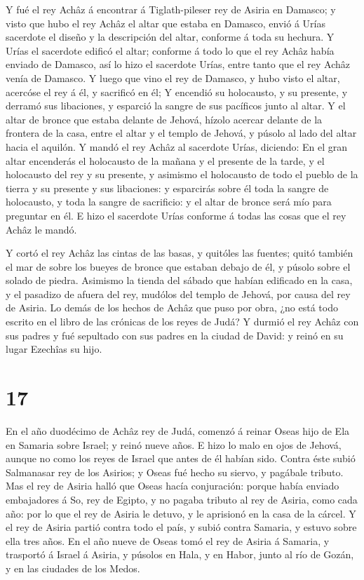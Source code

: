  Y fué el rey Achâz á encontrar á Tiglath-pileser rey de
Asiria en Damasco; y visto que hubo el rey Achâz el altar que estaba en
Damasco, envió á Urías sacerdote el diseño y la descripción del altar,
conforme á toda su hechura.  Y Urías el sacerdote edificó
el altar; conforme á todo lo que el rey Achâz había enviado de Damasco,
así lo hizo el sacerdote Urías, entre tanto que el rey Achâz venía de
Damasco.  Y luego que vino el rey de Damasco, y hubo visto
el altar, acercóse el rey á él, y sacrificó en él;  Y
encendió su holocausto, y su presente, y derramó sus libaciones, y
esparció la sangre de sus pacíficos junto al altar.  Y el
altar de bronce que estaba delante de Jehová, hízolo acercar delante de
la frontera de la casa, entre el altar y el templo de Jehová, y púsolo
al lado del altar hacia el aquilón.  Y mandó el rey Achâz
al sacerdote Urías, diciendo: En el gran altar encenderás el holocausto
de la mañana y el presente de la tarde, y el holocausto del rey y su
presente, y asimismo el holocausto de todo el pueblo de la tierra y su
presente y sus libaciones: y esparcirás sobre él toda la sangre de
holocausto, y toda la sangre de sacrificio: y el altar de bronce será
mío para preguntar en él.  E hizo el sacerdote Urías
conforme á todas las cosas que el rey Achâz le mandó.

 Y cortó el rey Achâz las cintas de las basas, y quitóles
las fuentes; quitó también el mar de sobre los bueyes de bronce que
estaban debajo de él, y púsolo sobre el solado de piedra. 
Asimismo la tienda del sábado que habían edificado en la casa, y el
pasadizo de afuera del rey, mudólos del templo de Jehová, por causa del
rey de Asiria.  Lo demás de los hechos de Achâz que puso
por obra, ¿no está todo escrito en el libro de las crónicas de los reyes
de Judá?  Y durmió el rey Achâz con sus padres y fué
sepultado con sus padres en la ciudad de David: y reinó en su lugar
Ezechîas su hijo.

\hypertarget{section-16}{%
\section{17}\label{section-16}}

 En el año duodécimo de Achâz rey de Judá, comenzó á reinar
Oseas hijo de Ela en Samaria sobre Israel; y reinó nueve años.
 E hizo lo malo en ojos de Jehová, aunque no como los reyes
de Israel que antes de él habían sido.  Contra éste subió
Salmanasar rey de los Asirios; y Oseas fué hecho su siervo, y pagábale
tributo.  Mas el rey de Asiria halló que Oseas hacía
conjuración: porque había enviado embajadores á So, rey de Egipto, y no
pagaba tributo al rey de Asiria, como cada año: por lo que el rey de
Asiria le detuvo, y le aprisionó en la casa de la cárcel.  Y
el rey de Asiria partió contra todo el país, y subió contra Samaria, y
estuvo sobre ella tres años.  En el año nueve de Oseas tomó
el rey de Asiria á Samaria, y trasportó á Israel á Asiria, y púsolos en
Hala, y en Habor, junto al río de Gozán, y en las ciudades de los Medos.

